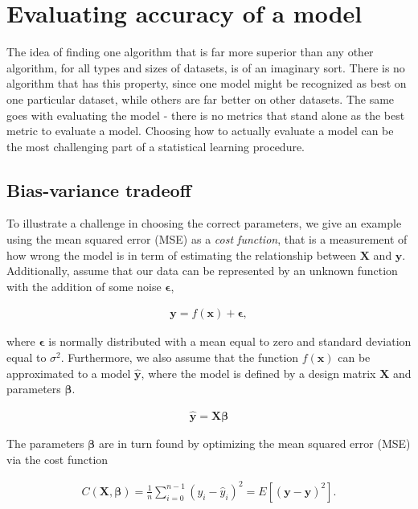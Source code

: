 \section{Evaluating accuracy of a model}

The idea of finding one algorithm that is far more superior than any other algorithm, for all types and sizes of datasets, is of an imaginary sort. There is no algorithm that has this property, since one model might be recognized as best on one particular dataset, while others are far better on other datasets. The same goes with evaluating the model - there is no metrics that stand alone as the best metric to evaluate a model. Choosing how to actually evaluate a model can be the most challenging part of a statistical learning procedure.


\subsection{Bias-variance tradeoff}

To illustrate a challenge in choosing the correct parameters, we give an example using the mean squared error (MSE) as a \textit{cost function}, that is a measurement of how wrong the model is in term of estimating the relationship between $\textbf{X}$ and $\textbf{y}$. Additionally, assume that our data can be represented by an unknown function with the addition of some noise $\boldsymbol{\epsilon}$,

\begin{align*}
\boldsymbol{y}=f(\boldsymbol{x}) + \boldsymbol{\epsilon},
\end{align*}

where $\boldsymbol{\epsilon}$ is normally distributed with a mean equal to zero and standard deviation equal to $\sigma^2$. Furthermore, we also assume that the function $f(\boldsymbol{x})$ can be approximated to a model $\boldsymbol{\hat{y}}$, where the model is defined by a design matrix $\boldsymbol{X}$ and parameters $\boldsymbol{\beta}$.

\begin{align*}
\boldsymbol{\hat{y}} = \boldsymbol{X}\boldsymbol{\beta}
\end{align*}


The parameters $\boldsymbol{\beta}$ are in turn found by optimizing the mean squared error (MSE) via the cost function

\begin{align*}
C(\boldsymbol{X},\boldsymbol{\beta}) =\frac{1}{n}\sum_{i=0}^{n-1}(y_i-\hat{y}_i)^2= E\left[(\boldsymbol{y}-\boldsymbol{\hat{y}})^2\right].
\end{align*}


